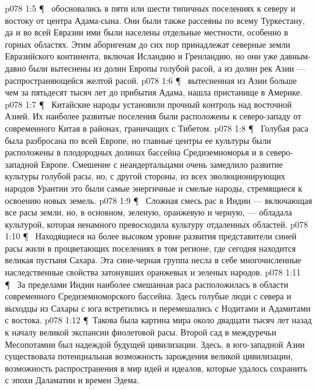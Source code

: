 \vs p078 1:5 \P\ \bibnobreakspace {} обосновались в пяти или шести типичных поселениях к северу и востоку от центра Адама\hyp{}сына. Они были также рассеяны по всему Туркестану, да и во всей Евразии ими были населены отдельные местности, особенно в горных областях. Этим аборигенам до сих пор принадлежат северные земли Евразийского континента, включая Исландию и Гренландию, но они уже давным\hyp{}давно были вытеснены из долин Европы голубой расой, а из долин рек Азии --- распространяющейся желтой расой.
\vs p078 1:6 \P\ \bibnobreakspace {} вытесненная из Азии больше чем за пятьдесят тысяч лет до прибытия Адама, нашла пристанище в Америке.
\vs p078 1:7 \P\ \bibnobreakspace {} Китайские народы установили прочный контроль над восточной Азией. Их наиболее развитые поселения были расположены к северо\hyp{}западу от современного Китая в районах, граничащих с Тибетом.
\vs p078 1:8 \P\ \bibnobreakspace {} Голубая раса была разбросана по всей Европе, но главные центры ее культуры были расположены в плодородных долинах бассейна Средиземноморья и в северо\hyp{}западной Европе. Смешение с неандертальцами очень замедлило развитие культуры голубой расы, но, с другой стороны, из всех эволюционирующих народов Урантии это были самые энергичные и смелые народы, стремящиеся к освоению новых земель.
\vs p078 1:9 \P\ \bibnobreakspace {} Сложная смесь рас в Индии --- включающая все расы земли, но, в основном, зеленую, оранжевую и черную, --- обладала культурой, которая ненамного превосходила культуру отдаленных областей.
\vs p078 1:10 \P\ \bibnobreakspace {} Находящиеся на более высоком уровне развития представители синей расы жили в процветающих поселениях в том регионе, где сегодня находится великая пустыня Сахара. Эта сине\hyp{}черная группа несла в себе многочисленные наследственные свойства затонувших оранжевых и зеленых народов.
\vs p078 1:11 \P\ \bibnobreakspace {} За пределами Индии наиболее смешанная раса расположилась в области современного Средиземноморского бассейна. Здесь голубые люди с севера и выходцы из Сахары с юга встретились и перемешались с Нодитами и Адамитами с востока.
\vs p078 1:12 \P\ Такова была картина мира около двадцати тысяч лет назад к началу великой экспансии фиолетовой расы. Второй сад в междуречьи Месопотамии был надеждой будущей цивилизации. Здесь, в юго\hyp{}западной Азии существовала потенциальная возможность зарождения великой цивилизации, возможность распространения в мир идей и идеалов, которые удалось сохранить с эпохи Даламатии и времен Эдема.
